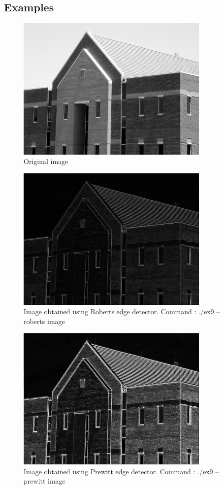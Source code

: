 \documentclass[10pt]{article}
\begin{document}
\subsection{Examples}
\begin{figure}[!ht]
	\centering
	\includegraphics[height=200pt]{./ex9/building.jpg}
	\caption{Original image}
\end{figure}
\begin{figure}[!ht]
	\centering
	\includegraphics[height=200pt]{./ex9/building_roberts.jpg}
	\caption{Image obtained using Roberts edge detector. Command : ./ex9 --roberts image}
\end{figure}
\begin{figure}[!ht]
	\centering
	\includegraphics[height=200pt]{./ex9/building_prewitt.jpg}
	\caption{Image obtained using Prewitt edge detector. Command : ./ex9 --prewitt image}
\end{figure}
\end{document}
